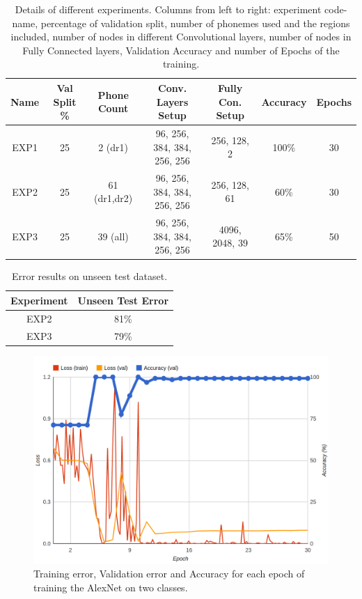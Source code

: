 \begin{table}
\hskip-2.7cm\begin{tabular}{|c|c|c|c|c|c|c|}
\hline
Name & Val Split \% & Phone Count & Conv. Layers Setup & Fully Con. Setup & Accuracy & Epochs \\
\hline
EXP1 & 25 & 2 (dr1) & 96, 256, 384, 384, 256, 256 & 256, 128, 2 & 100\% & 30 \\
\hline
EXP2 & 25 & 61 (dr1,dr2) & 96, 256, 384, 384, 256, 256 & 256, 128, 61 & 60\% & 30 \\
\hline
EXP3 & 25 & 39 (all) & 96, 256, 384, 384, 256, 256 & 4096, 2048, 39 & 65\% & 50 \\
\hline
\end{tabular} 
\caption{\label{table:results} Details of different experiments. Columns from left to right: experiment code-name, percentage of validation split, number of phonemes used and the regions included, number of nodes in different Convolutional layers, number of nodes in Fully Connected layers, Validation Accuracy and number of Epochs of the training.}
\end{table}

\begin{table}
\centering
\begin{tabular}{|c|c|}
\hline
Experiment & Unseen Test Error\\
\hline
EXP2 & 81\% \\
EXP3 & 79\% \\
\hline
\end{tabular}
\caption{\label{table:unseen} Error results on unseen test dataset.}
\end{table}

\begin{figure}[H]
\centering
\includegraphics[scale=0.25]{figs/twoclass.png}
\caption{\label{fig:twoClass}Training error, Validation error and Accuracy for each epoch of training the AlexNet on two classes.}
\end{figure}


